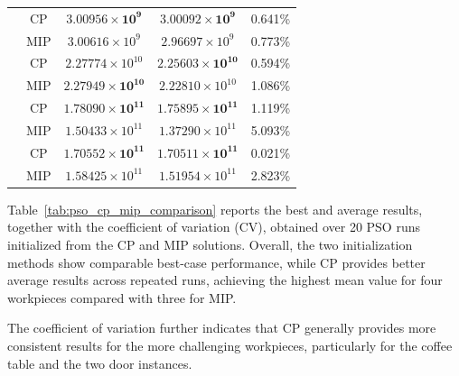 \begin{table}[!t]
\begin{tabular}{l c c c c}
		\hline
		
		 & CP & $\mathbf{3.00956\times 10^{9}}$ & $\mathbf{3.00092\times 10^{9}}$ & 0.641\% \\
		& MIP & $3.00616\times 10^{9}$ & $2.96697\times 10^{9}$ & 0.773\% \\
		
		\hline
		
		 & CP & $2.27774\times 10^{10}$ & $\mathbf{2.25603\times 10^{10}}$ & 0.594\% \\
		& MIP & $\mathbf{2.27949\times 10^{10}}$ & $2.22810\times 10^{10}$ & 1.086\% \\
		
		\hline
		
		 & CP & $\mathbf{1.78090\times 10^{11}}$ & $\mathbf{1.75895\times 10^{11}}$ & 1.119\% \\
		& MIP & $1.50433\times 10^{11}$ & $1.37290\times 10^{11}$ & 5.093\% \\
		
		\hline
		
		 & CP & $\mathbf{1.70552\times 10^{11}}$ & $\mathbf{1.70511\times 10^{11}}$ & 0.021\% \\
		& MIP & $1.58425\times 10^{11}$ & $1.51954\times 10^{11}$ & 2.823\% \\
		
		\hline
		
	\end{tabular}
	
\end{table}

Table~\ref{tab:pso_cp_mip_comparison} reports the best and average results, together with the coefficient of variation (CV), obtained over 20 PSO runs initialized from the CP and MIP solutions. Overall, the two initialization methods show comparable best-case performance, while CP provides better average results across repeated runs, achieving the highest mean value for four workpieces compared with three for MIP. 

The coefficient of variation further indicates that CP generally provides more consistent results for the more challenging workpieces, particularly for the coffee table and the two door instances. 

